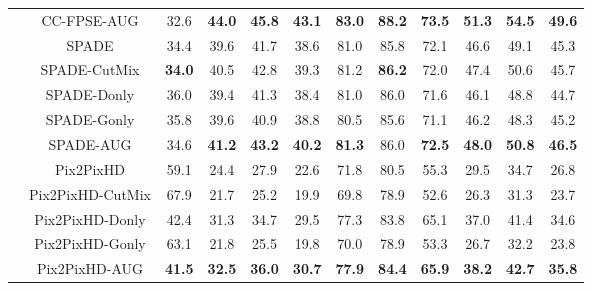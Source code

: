 \documentclass[final]{cvpr}
\newcommand\+{\mkern4mu}
\begin{document}
\begin{table*}[h]
{\begin{tabular}{@{}lc@{\hspace{0.3cm}}c@{\hspace{0.7cm}}ccc@{\hspace{0.7cm}}ccc@{\hspace{0.7cm}}ccc@{}}
			& \small CC-FPSE-AUG & \small 32.6 & \small \textbf{44.0} & \small \textbf{45.8} & \small \textbf{43.1} & \small \textbf{83.0} & \small \textbf{88.2} & \small \textbf{73.5} & \small \textbf{51.3} & \small \textbf{54.5} & \small \textbf{49.6} \tabularnewline[0.2cm] 
			
			


			& \small SPADE & \small 34.4 & \small 39.6 & \small 41.7 & \small 38.6 & \small 81.0 & \small 85.8 & \small 72.1 & \small 46.6 & \small 49.1 & \small 45.3 \tabularnewline
			
			& \small SPADE-CutMix & \small \textbf{34.0} & \small 40.5 & \small 42.8 & \small 39.3 & \small 81.2 & \small \textbf{86.2} & \small 72.0 & \small 47.4 & \small 50.6 & \small 45.7 \tabularnewline
			
			& \small SPADE-Donly & \small 36.0 & \small	39.4 & \small	41.3 & \small	38.4 & \small	81.0 & \small	86.0 & \small	71.6 & \small	46.1 & \small	48.8 & \small	44.7 \tabularnewline
			& \small SPADE-Gonly & \small 35.8 & \small	39.6 & \small 40.9 & \small	38.8 & \small 80.5 & \small	85.6 & \small 71.1 & \small	46.2 & \small 48.3 & \small 45.2 \tabularnewline
			
			& \small SPADE-AUG & \small 34.6 & \small \textbf{41.2} & \small \textbf{43.2} & \small \textbf{40.2} & \small \textbf{81.3} & \small 86.0 & \small \textbf{72.5} & \small \textbf{48.0} & \small \textbf{50.8} & \small \textbf{46.5} \tabularnewline[0.2cm] 
			


			& \small Pix2PixHD & \small 59.1 & \small 24.4 & \small 27.9 & \small 22.6 & \small 71.8 & \small 80.5 & \small 55.3 & \small 29.5 & \small 34.7 & \small 26.8 \tabularnewline
			
			& \small Pix2PixHD-CutMix & \small 67.9 & \small 21.7 & \small 25.2 & \small 19.9 & \small 69.8 & \small 78.9 & \small 52.6 & \small 26.3 & \small 31.3 & \small	23.7 \tabularnewline
			
			& \small Pix2PixHD-Donly & \small 42.4 & \small	31.3 & \small 34.7 & \small	29.5 & \small 77.3 & \small	83.8 & \small 65.1 & \small	37.0 & \small 41.4 & \small	34.6 \tabularnewline
			& \small Pix2PixHD-Gonly & \small 63.1 & \small	21.8 & \small 25.5 & \small	19.8 & \small 70.0 & \small	78.9 & \small 53.3 & \small	26.7 & \small 32.2 & \small	23.8 \tabularnewline
			
			& \small Pix2PixHD-AUG & \small \textbf{41.5} & \small \textbf{32.5} & \small \textbf{36.0} & \small \textbf{30.7} & \small \textbf{77.9} & \small \textbf{84.4} & \small \textbf{65.9} & \small \textbf{38.2} & \small \textbf{42.7} & \small \textbf{35.8} \tabularnewline
			



\end{tabular}}
\end{table*}
\end{document}
